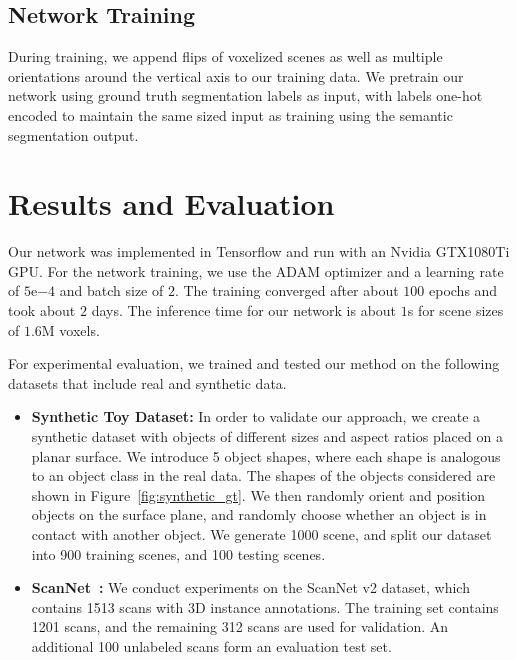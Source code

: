 \documentclass[10pt,twocolumn,letterpaper]{article}
\newcommand{\boldparagraph}[1]{\vspace{0.5em}\noindent{\bf #1} }
\begin{document}
\subsection{Network Training} \label{subsec:training}



\boldparagraph{Training Data.} During training, we append flips of voxelized scenes as well as multiple orientations around the vertical axis to our training data.
We pretrain our network using ground truth segmentation labels as input, with labels one-hot encoded to maintain the same sized input as training using the semantic segmentation output. 
 \section{Results and Evaluation}

\boldparagraph{Setup.}
Our network was implemented in Tensorflow and run with an Nvidia GTX1080Ti GPU.
For the network training, we use the ADAM optimizer and a learning rate of $5\mathrm{e}{-4}$ and batch size of $2$. 
The training converged after about $100$ epochs and took about $2$ days. The inference time for our network is about $1$s for scene sizes of $1.6$M voxels.

\boldparagraph{Datasets.}
For experimental evaluation, we trained and tested our method on the following datasets that include real and synthetic data.
\begin{itemize}[topsep=2pt,leftmargin=*]
\setlength\itemsep{0mm}
\item \textbf{Synthetic Toy Dataset:} In order to validate our approach, we create a synthetic dataset with objects of different sizes and aspect ratios placed on a planar surface.
  We introduce 5 object shapes, where each shape is analogous to an object class in the real data.
  The shapes of the objects considered are shown in Figure~\ref{fig:synthetic_gt}.
  We then randomly orient and position objects on the surface plane, and randomly choose whether an object is in contact with another object.
  We generate 1000 scene, and split our dataset into 900 training scenes, and 100 testing scenes.
  \item \textbf{ScanNet~\cite{Dai-et-al-CVPR-2017}:} We conduct experiments on the ScanNet v2 dataset, which contains 1513 scans with 3D instance annotations.
The training set contains 1201 scans, and the remaining 312 scans are used for validation.
  An additional 100 unlabeled scans form an evaluation test set. 
  
\end{itemize}
\end{document}
